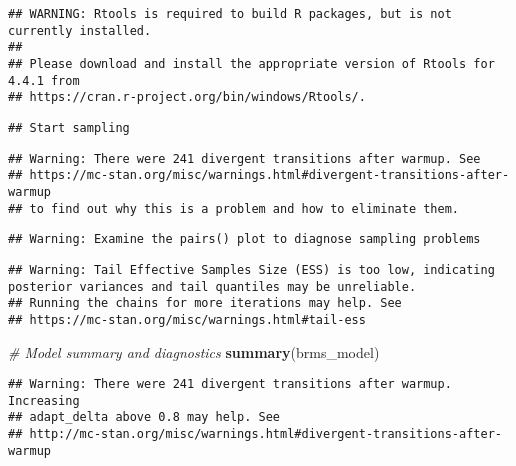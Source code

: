 \documentclass[
]{article}
\newenvironment{Shaded}{\begin{snugshade}}{\end{snugshade}}
\newcommand{\CommentTok}[1]{\textcolor[rgb]{0.56,0.35,0.01}{\textit{#1}}}
\newcommand{\FunctionTok}[1]{\textcolor[rgb]{0.13,0.29,0.53}{\textbf{#1}}}
\newcommand{\NormalTok}[1]{#1}
\begin{document}
\begin{verbatim}
## WARNING: Rtools is required to build R packages, but is not currently installed.
## 
## Please download and install the appropriate version of Rtools for 4.4.1 from
## https://cran.r-project.org/bin/windows/Rtools/.
\end{verbatim}

\begin{verbatim}
## Start sampling
\end{verbatim}

\begin{verbatim}
## Warning: There were 241 divergent transitions after warmup. See
## https://mc-stan.org/misc/warnings.html#divergent-transitions-after-warmup
## to find out why this is a problem and how to eliminate them.
\end{verbatim}

\begin{verbatim}
## Warning: Examine the pairs() plot to diagnose sampling problems
\end{verbatim}

\begin{verbatim}
## Warning: Tail Effective Samples Size (ESS) is too low, indicating posterior variances and tail quantiles may be unreliable.
## Running the chains for more iterations may help. See
## https://mc-stan.org/misc/warnings.html#tail-ess
\end{verbatim}

\begin{Shaded}
\begin{Highlighting}[]
\CommentTok{\# Model summary and diagnostics}
\FunctionTok{summary}\NormalTok{(brms\_model)}
\end{Highlighting}
\end{Shaded}

\begin{verbatim}
## Warning: There were 241 divergent transitions after warmup. Increasing
## adapt_delta above 0.8 may help. See
## http://mc-stan.org/misc/warnings.html#divergent-transitions-after-warmup
\end{verbatim}
\end{document}
